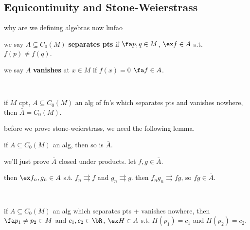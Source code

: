 \subsection{Equicontinuity and Stone-Weierstrass}
why are we defining algebras now lmfao

\begin{defn}
	we say $A\subseteq C_{0}(M)$ \textbf{separates pts} if $\fa p,q\in M$, $\ex f\in A$ s.t.
	$f(p)\neq f(q)$.

	we say $A$ \textbf{vanishes} at $x\in M$ if $f(x)=0$ $\fa f\in A$.
\end{defn} \

\begin{thm}[title=Stone-Weierstrass]
	if $M$ cpt, $A\subseteq C_{0}(M)$ an alg of fn's which separates pts and
	vanishes nowhere, then $\bar{A}=C_{0}(M)$.
\end{thm}


before we prove stone-weierstrass, we need the following lemma.
\begin{lm}
	if $A\subseteq C_{0}(M)$ an alg, then so is $\bar{A}$.
\end{lm}

\newpage
\begin{pf}[source=Primary Source Material]
	we'll just prove $\bar{A}$ closed under products. let $f,g\in\bar{A}$.

	then $\ex f_{n},g_{n}\in A$ s.t.
	$f_{n}\rightrightarrows f$ and $g_{n}\rightrightarrows g$.
	then $f_{n}g_{n}\rightrightarrows fg$, so $fg\in\bar{A}$.
\end{pf} \

\begin{lm}
	if $A\subseteq C_{0}(M)$ an alg which separates pts + vanishes nowhere,
	then $\fa p_{1}\neq p_{2}\in M$ and $c_{1},c_{2}\in\bR$,
	$\ex H\in A$ s.t. $H(p_{1})=c_{1}$ and $H(p_{2})=c_{2}$.
\end{lm} \

